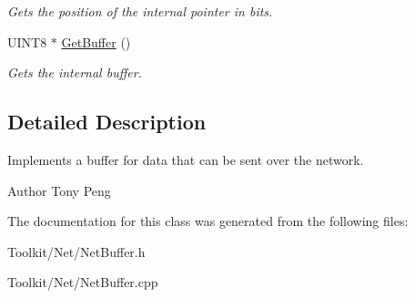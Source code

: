 \begin{DoxyCompactItemize}
\begin{DoxyCompactList}\small\item\em Gets the position of the internal pointer in bits. \end{DoxyCompactList}\item 
\hypertarget{class_rhesus_1_1_toolkit_1_1_net_1_1_net_buffer_a97fe15d9a739c32287ee3b0b957745f4}{U\-I\-N\-T8 $\ast$ \hyperlink{class_rhesus_1_1_toolkit_1_1_net_1_1_net_buffer_a97fe15d9a739c32287ee3b0b957745f4}{Get\-Buffer} ()}\label{class_rhesus_1_1_toolkit_1_1_net_1_1_net_buffer_a97fe15d9a739c32287ee3b0b957745f4}

\begin{DoxyCompactList}\small\item\em Gets the internal buffer. \end{DoxyCompactList}\end{DoxyCompactItemize}


\subsection{Detailed Description}
Implements a buffer for data that can be sent over the network. 

\begin{DoxyAuthor}{Author}
Tony Peng 
\end{DoxyAuthor}


The documentation for this class was generated from the following files\-:\begin{DoxyCompactItemize}
\item 
Toolkit/\-Net/Net\-Buffer.\-h\item 
Toolkit/\-Net/Net\-Buffer.\-cpp\end{DoxyCompactItemize}
